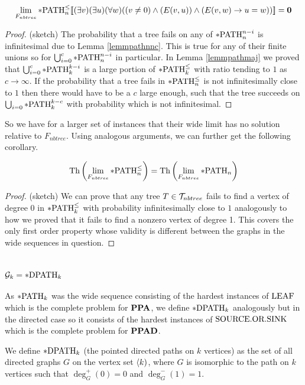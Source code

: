 \begin{thrm}
\[\lim_{F_{nbtree}}*\text{PATH}^\leq_n[\![(\exists v)(\exists u)(\forall w)((v\not=0)\land (E(v,u)) \land(E(v,w) \to u=w))]\!]=\textbf{0}\]
\end{thrm}
\begin{proof}(sketch)
The probability that a tree fails on any of $*\text{PATH}_n^{n-i}$ is infinitesimal due to Lemma \ref{lemmpathnnc}. This is true for any of their finite unions so for $\bigcup_{i=0}^c*\text{PATH}^{n-i}_n$ in particular. In Lemma \ref{lemmpathmaj} we proved that $\bigcup_{i=0}^c*\text{PATH}^{k-i}_k$ is a large portion of $*\text{PATH}^\leq_k$ with ratio tending to $1$ as $c\to\infty$. If the probability that a tree fails in $*\text{PATH}^\leq_n$ is not infinitesimally close to $1$ then there would have to be a $c$ large enough, such that the tree succeeds on $\bigcup_{i=0}*\text{PATH}_k^{k-c}$ with probability which is not infinitesimal.
\end{proof}

So we have for a larger set of instances that their wide limit has no solution relative to $F_{nbtree}$. Using analogous arguments, we can further get the following corollary.

\begin{crll}\label{crllpPATHl}
\[\text{Th}\left(\lim_{F_{nbtree}}*\text{PATH}^\leq_n\right)=\text{Th}\left(\lim_{F_{nbtree}}*\text{PATH}_n\right)\]
\end{crll}
\begin{proof}(sketch)
We can prove that any tree $T\in\mathcal{T}_{nbtree}$ fails to find a vertex of degree 0 in $*\text{PATH}^\leq_k$ with probability infinitesimally close to $1$ analogously to how we proved that it fails to find a nonzero vertex of degree 1. This covers the only first order property whose validity is different between the graphs in the wide sequences in question.
\end{proof}



\section{\texorpdfstring{$\mathcal{G}_k=*\text{DPATH}_k$}{Gk=*DPATHk}}\label{secpDPATH}

As $*\text{PATH}_k$ was the wide sequence consisting of the hardest instances of $\text{LEAF}$ which is the complete problem for $\textbf{PPA}$, we define $*\text{DPATH}_k$ analogously but in the directed case so it consists of the hardest instances of $\text{SOURCE.OR.SINK}$ which is the complete problem for $\textbf{PPAD}$.


\begin{defi}
We define $*\text{DPATH}_k$ (the pointed directed paths on $k$ vertices) as the set of all directed graphs $G$ on the vertex set $\langle k)$, where $G$ is isomorphic to the path on $k$ vertices such that $\deg_G^{+}(0)=0$ and $\deg_G^{-}(1)=1$.
\end{defi}

